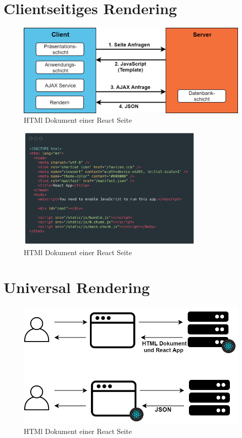 \documentclass[runningheads]{llncs}
\begin{document}
\newpage

\section{Clientseitiges Rendering}
\label{sec:Clientseitiges Rendering}

\begin{figure}[h]
  \centering
  \includegraphics[width=12cm]{images/client}
  \caption{HTMl Dokument einer React Seite}
\end{figure}

\begin{figure}[h]
  \centering
  \includegraphics[width=9cm]{images/react-code-small}
  \caption{HTMl Dokument einer React Seite}
\end{figure}


\newpage

\section{Universal Rendering}
\label{sec:Universal Rendering}

\begin{figure}[h]
  \centering
  \includegraphics[width=12cm]{images/react}
  \caption{HTMl Dokument einer React Seite}
\end{figure}
\end{document}
